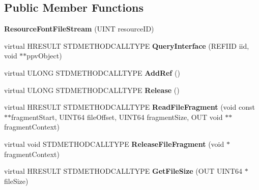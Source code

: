 \subsection*{Public Member Functions}
\begin{DoxyCompactItemize}
\item 
\hypertarget{class_resource_font_file_stream_a9a5ab096c5ebb91904607f1f5770623a}{{\bfseries Resource\-Font\-File\-Stream} (U\-I\-N\-T resource\-I\-D)}\label{class_resource_font_file_stream_a9a5ab096c5ebb91904607f1f5770623a}

\item 
\hypertarget{class_resource_font_file_stream_aa05f74a3a642894808c75aaf6ed66af6}{virtual H\-R\-E\-S\-U\-L\-T S\-T\-D\-M\-E\-T\-H\-O\-D\-C\-A\-L\-L\-T\-Y\-P\-E {\bfseries Query\-Interface} (R\-E\-F\-I\-I\-D iid, void $\ast$$\ast$ppv\-Object)}\label{class_resource_font_file_stream_aa05f74a3a642894808c75aaf6ed66af6}

\item 
\hypertarget{class_resource_font_file_stream_a39b3b75edab831b285b34a29d5c8f4a6}{virtual U\-L\-O\-N\-G S\-T\-D\-M\-E\-T\-H\-O\-D\-C\-A\-L\-L\-T\-Y\-P\-E {\bfseries Add\-Ref} ()}\label{class_resource_font_file_stream_a39b3b75edab831b285b34a29d5c8f4a6}

\item 
\hypertarget{class_resource_font_file_stream_a963e399b8a36d02d1af29a096021a294}{virtual U\-L\-O\-N\-G S\-T\-D\-M\-E\-T\-H\-O\-D\-C\-A\-L\-L\-T\-Y\-P\-E {\bfseries Release} ()}\label{class_resource_font_file_stream_a963e399b8a36d02d1af29a096021a294}

\item 
\hypertarget{class_resource_font_file_stream_a23d9b9edfdc9fd3adf8ac6f79f71eba8}{virtual H\-R\-E\-S\-U\-L\-T S\-T\-D\-M\-E\-T\-H\-O\-D\-C\-A\-L\-L\-T\-Y\-P\-E {\bfseries Read\-File\-Fragment} (void const $\ast$$\ast$fragment\-Start, U\-I\-N\-T64 file\-Offset, U\-I\-N\-T64 fragment\-Size, O\-U\-T void $\ast$$\ast$fragment\-Context)}\label{class_resource_font_file_stream_a23d9b9edfdc9fd3adf8ac6f79f71eba8}

\item 
\hypertarget{class_resource_font_file_stream_a8f24ef617d76d2d6ae513bd40875c12f}{virtual void S\-T\-D\-M\-E\-T\-H\-O\-D\-C\-A\-L\-L\-T\-Y\-P\-E {\bfseries Release\-File\-Fragment} (void $\ast$fragment\-Context)}\label{class_resource_font_file_stream_a8f24ef617d76d2d6ae513bd40875c12f}

\item 
\hypertarget{class_resource_font_file_stream_a75dbb02d17cface6d956b23121d13118}{virtual H\-R\-E\-S\-U\-L\-T S\-T\-D\-M\-E\-T\-H\-O\-D\-C\-A\-L\-L\-T\-Y\-P\-E {\bfseries Get\-File\-Size} (O\-U\-T U\-I\-N\-T64 $\ast$file\-Size)}\label{class_resource_font_file_stream_a75dbb02d17cface6d956b23121d13118}


\end{DoxyCompactItemize}
